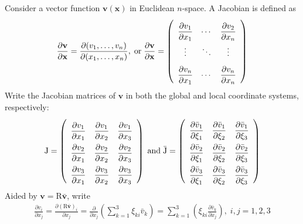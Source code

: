\documentclass[a4paper,12pt,dvips]{article}
\begin{document}
Consider a vector function $\mathbf{v}(\mathbf{x})$ in Euclidean $n$-space.  A
Jacobian is defined as
\begin{align*}
  \dfrac{\partial\mathbf{v}}{\partial\mathbf{x}}
  = \dfrac{\partial(v_1, \ldots, v_n)}{\partial(x_1, \ldots, x_n)},
  \; \mbox{or} \;
  \renewcommand{\arraystretch}{2.2}
  \dfrac{\partial\mathbf{v}}{\partial\mathbf{x}}
  = \left(\begin{array}{ccc}
    \dfrac{\partial v_1}{\partial x_1} &
    \cdots &
    \dfrac{\partial v_2}{\partial x_n} \\
    \vdots & \ddots & \vdots \\
    \dfrac{\partial v_n}{\partial x_1} &
    \cdots &
    \dfrac{\partial v_n}{\partial x_n}
  \end{array}\right)
\end{align*}
Write the Jacobian matrices of $\mathbf{v}$ in both the global and local
coordinate systems, respectively:
\begin{align*}
  \renewcommand{\arraystretch}{2.2}
  \mathrm{J}
  = \left(\begin{array}{ccc}
    \dfrac{\partial v_1}{\partial x_1} &
    \dfrac{\partial v_1}{\partial x_2} &
    \dfrac{\partial v_1}{\partial x_3} \\
    \dfrac{\partial v_2}{\partial x_1} &
    \dfrac{\partial v_2}{\partial x_2} &
    \dfrac{\partial v_2}{\partial x_3} \\
    \dfrac{\partial v_3}{\partial x_1} &
    \dfrac{\partial v_3}{\partial x_2} &
    \dfrac{\partial v_3}{\partial x_3}
  \end{array}\right)
  \; \mbox{and} \;
  \bar{\mathrm{J}}
  = \left(\begin{array}{ccc}
    \dfrac{\partial \bar{v}_1}{\partial\xi_1} &
    \dfrac{\partial \bar{v}_1}{\partial\xi_2} &
    \dfrac{\partial \bar{v}_1}{\partial\xi_3} \\
    \dfrac{\partial \bar{v}_2}{\partial\xi_1} &
    \dfrac{\partial \bar{v}_2}{\partial\xi_2} &
    \dfrac{\partial \bar{v}_2}{\partial\xi_3} \\
    \dfrac{\partial \bar{v}_3}{\partial\xi_1} &
    \dfrac{\partial \bar{v}_3}{\partial\xi_2} &
    \dfrac{\partial \bar{v}_3}{\partial\xi_3}
  \end{array}\right)
\end{align*}
Aided by $\mathbf{v} = \mathrm{R}\bar{\mathbf{v}}$, write
\begin{align*}
  \frac{\partial v_i}{\partial x_j}
  = \frac{\partial (\mathrm{R}\bar{\mathbf{v}})_i}{\partial x_j}
  = \frac{\partial}{\partial x_j}
    \left( \sum_{k=1}^3 \xi_{ki}\bar{v}_k \right)
  = \sum_{k=1}^3
    \left( \xi_{ki} \frac{\partial \bar{v}_k}{\partial x_j} \right),
  \; i,j = 1, 2, 3
\end{align*}
\end{document}
